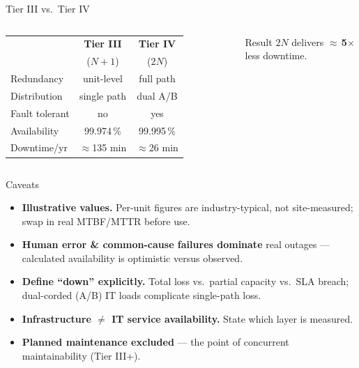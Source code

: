 \documentclass[aspectratio=169,10pt]{beamer}
\begin{document}
\begin{frame}{Tier III vs.\ Tier IV}
  \begin{columns}[c]
      \renewcommand{\arraystretch}{1.3}
      \footnotesize
      \begin{tabular}{lcc}
        \toprule
         & \textbf{Tier III} & \textbf{Tier IV} \\
         & ($N{+}1$) & ($2N$) \\
        \midrule
        Redundancy   & unit-level & full path \\
        Distribution & single path & dual A/B \\
        Fault tolerant & no & yes \\
        Availability & 99.974\,\% & 99.995\,\% \\
        Downtime/yr  & $\approx$135 min & $\approx$26 min \\
        \bottomrule
      \end{tabular}

      \vspace{0.8em}
      \begin{block}{Result}
        \centering $2N$ delivers $\approx\,$\textbf{5$\times$} less downtime.
      \end{block}
      \centering
  \end{columns}
\end{frame}

\begin{frame}{Caveats}
  \begin{itemize}
    \item \textbf{Illustrative values.} Per-unit figures are industry-typical, not site-measured;
          swap in real MTBF/MTTR before use.
    \item \textbf{Human error \& common-cause failures dominate} real outages --- calculated
          availability is optimistic versus observed.
    \item \textbf{Define ``down'' explicitly.} Total loss vs.\ partial capacity vs.\ SLA breach;
          dual-corded (A/B) IT loads complicate single-path loss.
    \item \textbf{Infrastructure $\neq$ IT service availability.} State which layer is measured.
    \item \textbf{Planned maintenance excluded} --- the point of concurrent maintainability (Tier III+).
  \end{itemize}
\end{frame}
\end{document}
